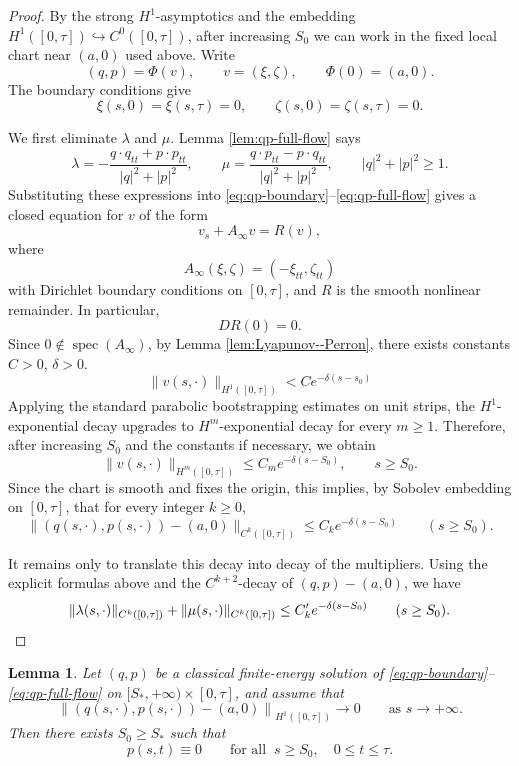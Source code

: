 \documentclass[11pt]{amsart}
\theoremstyle{plain}
\newtheorem{lem}[thm]{Lemma}
\theoremstyle{definition}
\newcommand{\Norm}[1]{\left\lVert #1\right\rVert}
\begin{document}
\begin{proof}
By the strong $H^1$-asymptotics and the embedding
$H^1([0,\tau])\hookrightarrow C^0([0,\tau])$, after increasing $S_0$ we can
work in the fixed local chart near $(a,0)$ used above. Write
\[
 (q,p)=\Phi(v),\qquad v=(\xi,\zeta),\qquad \Phi(0)=(a,0).
\]
The boundary conditions give
\[
 \xi(s,0)=\xi(s,\tau)=0,
 \qquad
 \zeta(s,0)=\zeta(s,\tau)=0 .
\]

We first eliminate $\lambda$ and $\mu$. Lemma \ref{lem:qp-full-flow} says
\[
 \lambda
 =
 -\frac{q\cdot q_{tt}+p\cdot p_{tt}}{|q|^2+|p|^2},
 \qquad
 \mu
 =
 \frac{q\cdot p_{tt}-p\cdot q_{tt}}{|q|^2+|p|^2},\qquad
 |q|^2+|p|^2\geq 1 .
\]
Substituting these expressions into \eqref{eq:qp-boundary}--\eqref{eq:qp-full-flow} gives a closed equation
for $v$ of the form
\[
 v_s+A_\infty v=R(v),
\]
where
\[
 A_\infty(\xi,\zeta)=(-\xi_{tt},\zeta_{tt})
\]
with Dirichlet boundary conditions on $[0,\tau]$, and $R$ is the
smooth nonlinear remainder. In particular,
\[
 DR(0)=0 .
\]
Since $0\notin \operatorname{spec}(A_\infty)$, by  Lemma \ref{lem:Lyapunov--Perron}, there exists constants $C>0$, $\delta>0$.
\[\|v(s,\cdot)\|_{H^1([0,\tau])}<Ce^{-\delta(s-s_0)}\]
Applying the standard parabolic bootstrapping estimates on unit strips, the $H^1$-exponential decay upgrades to $H^m$-exponential decay for every $m\ge 1$. Therefore,
after increasing $S_0$ and the constants if necessary, we obtain
\[
\|v(s,\cdot)\|_{H^m([0,\tau])}
 \le C_m e^{-\delta(s-S_0)},
 \qquad s\ge S_0 .
\]
Since the chart is smooth and fixes the origin, this implies, by Sobolev embedding on $[0,\tau]$, that for every integer $k\geq 0$,
\[
 \|(q(s,\cdot),p(s,\cdot))-(a,0)\|_{C^k([0,\tau])}
 \leq
 C_k e^{-\delta(s-S_0)}
 \qquad
 (s\geq S_0).
\]

It remains only to translate this decay into decay of the multipliers. Using the
explicit formulas above and the $C^{k+2}$-decay of $(q,p)-(a,0)$, we have
\[
 \|\lambda(s,\cdot)\|_{C^k([0,\tau])}
 +
 \|\mu(s,\cdot)\|_{C^k([0,\tau])}
 \leq
 C'_k e^{-\delta(s-S_0)}
 \qquad
 (s\geq S_0).\qedhere
\]
\end{proof}



\begin{lem}\label{lem:forward-tail-rigidity}
Let $(q,p)$ be a classical finite-energy solution of \eqref{eq:qp-boundary}--\eqref{eq:qp-full-flow} on $[S_*,+\infty)\times [0,\tau]$, and assume that
\[
\Norm{(q(s,\cdot),p(s,\cdot))-(a,0)}_{H^1([0,\tau])}\to 0
\qquad\text{as }s\to +\infty.
\]
Then there exists $S_0\ge S_*$ such that
\[
p(s,t)\equiv 0
\qquad\text{for all }~s\ge S_0,
\quad 0\le t\le \tau.
\]
\end{lem}
\end{document}
